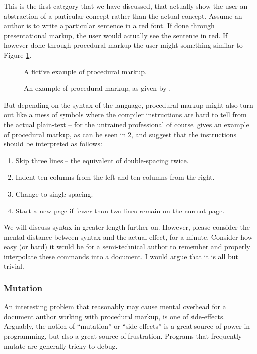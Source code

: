 \documentclass{scrreprt}
\begin{document}
This is the first category that we have discussed, that actually show the user an abstraction of a particular concept rather than the actual concept. Assume an author is to write a particular sentence in a red font. If done through presentational markup, the user would actually see the sentence in red. If however done through procedural markup the user might something similar to Figure \ref{fig:procedural-markup-red-sentence}.


\begin{figure}[h]
\centering
{}
\caption{A fictive example of procedural markup.}
\label{fig:procedural-markup-red-sentence}
\end{figure}


\begin{figure}[h]
\centering
{}
\caption{An example of procedural markup, as given by \citet{coombs}.}
\label{fig:procedural-markup-coombs}
\end{figure}



But depending on the syntax of the language, procedural markup might also turn out like a mess of symbols where the compiler instructions are hard to tell from the actual plain-text -- for the untrained professional of course. \citet{coombs} gives an example of procedural markup, as can be seen in \ref{fig:procedural-markup-coombs}, and suggest that the instructions should be interpreted as follows:

\begin{enumerate}
\item Skip three lines -- the equivalent of double-spacing twice.
\item Indent ten columns from the left and ten columns from the right.
\item Change to single-spacing.
\item Start a new page if fewer than two lines remain on the current page.
\end{enumerate}

We will discuss syntax in greater length further on. However, please consider the mental distance between syntax and the actual effect, for a minute. Consider how easy (or hard) it would be for a semi-technical author to remember and properly interpolate these commands into a document. I would argue that it is all but trivial.


\subsubsection{Mutation}
An interesting problem that reasonably may cause mental overhead for a document author working with procedural markup, is one of side-effects. Arguably, the notion of ``mutation'' or ``side-effects'' is a great source of power in programming, but also a great source of frustration. Programs that frequently mutate are generally tricky to debug.
\end{document}
